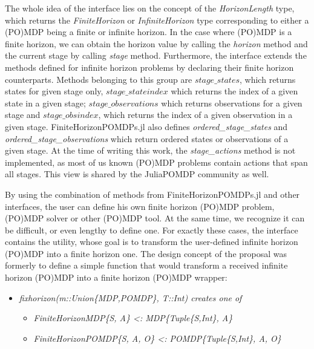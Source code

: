 The whole idea of the interface lies on the concept of the \textit{HorizonLength} type, which returns the \textit{FiniteHorizon} or \textit{InfiniteHorizon} type corresponding to either a (PO)MDP being a finite or infinite horizon. In the case where (PO)MDP is a finite horizon, we can obtain the horizon value by calling the \textit{horizon} method and the current stage by calling \textit{stage} method. Furthermore, the interface extends the methods defined for infinite horizon problems by declaring their finite horizon counterparts. Methods belonging to this group are $stage\_states$, which returns states for given stage only, $stage\_stateindex$ which returns the index of a given state in a given stage; $ stage\_observations$ which returns observations for a given stage and $stage\_obsindex$, which returns the index of a given observation in a given stage. FiniteHorizonPOMDPs.jl also defines \textit{ordered\_stage\_states} and \textit{ordered\_stage\_observations} which return ordered states or observations of a given stage. At the time of writing this work, the \textit{stage\_actions} method is not implemented, as most of us known (PO)MDP problems contain actions that span all stages. This view is shared by the JuliaPOMDP community as well.

By using the combination of methods from FiniteHorizonPOMDPs.jl and other interfaces, the user can define his own finite horizon (PO)MDP problem, (PO)MDP solver or other (PO)MDP tool. At the same time, we recognize it can be difficult, or even lengthy to define one. For exactly these cases, the interface contains the utility, whose goal is to transform the user-defined infinite horizon (PO)MDP into a finite horizon one.  The design concept of the proposal was formerly to define a simple function that would transform a received infinite horizon (PO)MDP into a finite horizon (PO)MDP wrapper:

\begin{samepage}
\begin{itemize}
    \item \textit{fixhorizon(m::Union\{MDP,POMDP\}, T::Int) creates one of}
    \begin{itemize}
        \item \textit{FiniteHorizonMDP\{S, A\} <: MDP\{Tuple\{S,Int\}, A\}}
        \item \textit{FiniteHorizonPOMDP\{S, A, O\} <: POMDP\{Tuple\{S,Int\}, A, O\}}
    \end{itemize}
\end{itemize}
\end{samepage}

